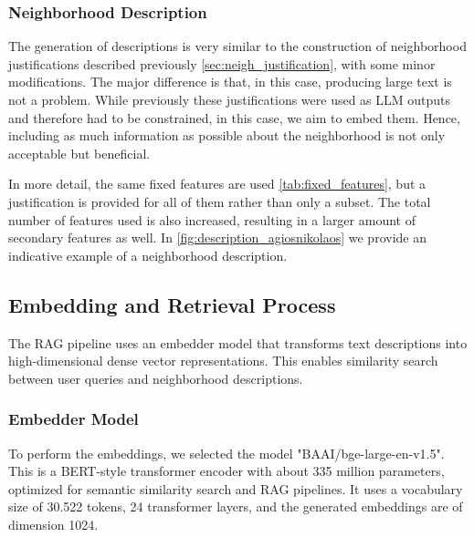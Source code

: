 \subsubsection{Neighborhood Description}
\label{sec:neigh_description}

The generation of descriptions is very similar to the construction of neighborhood justifications described previously \ref{sec:neigh_justification}, with some minor modifications. The major difference is that, in this case, producing large text is not a problem. While previously these justifications were used as LLM outputs and therefore had to be constrained, in this case, we aim to embed them. Hence, including as much information as possible about the neighborhood is not only acceptable but beneficial.

In more detail, the same fixed features are used \ref{tab:fixed_features}, but a justification is provided for all of them rather than only a subset. The total number of features used is also increased, resulting in a larger amount of secondary features as well. In \ref{fig:description_agiosnikolaos} we provide an indicative example of a neighborhood description.




\subsection{Embedding and Retrieval Process}

The RAG pipeline uses an embedder model that transforms text descriptions into high-dimensional dense vector representations. This enables similarity search between user queries and neighborhood descriptions. 



\subsubsection{Embedder Model}

To perform the embeddings, we selected the model "BAAI/bge-large-en-v1.5". This is a BERT-style transformer encoder with about 335 million parameters, optimized for semantic similarity search and RAG pipelines. It uses a vocabulary size of 30.522 tokens, 24 transformer layers, and the generated embeddings are of dimension 1024.


